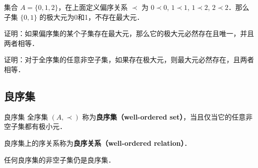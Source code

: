 \begin{example}{}
集合 $A=\{0,1,2\}$，在上面定义偏序关系 $\prec$ 为 $0\prec 0$, $1\prec 1$, $1\prec 2$, $2\prec 2$．那么子集 $\{0,1\}$ 的极大元为0和1，不存在最大元．
\end{example}

\begin{exercise}{}
证明：如果偏序集的某个子集存在最大元，那么它的极大元必然存在且唯一，并且两者相等．
\end{exercise}

\begin{exercise}{}
证明：对于全序集的任意非空子集，如果存在极大元，则最大元必然存在，且两者相等．
\end{exercise}

\subsection{良序集}

\begin{definition}{良序集}
全序集 $(A,\prec)$ 称为\textbf{良序集（well-ordered set）}，当且仅当它的任意非空子集都有极小元．
\end{definition}

良序集上的序关系称为\textbf{良序关系（well-ordered relation）}．

任何良序集的非空子集仍是良序集．